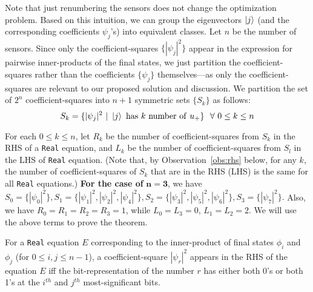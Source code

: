 Note that just renumbering the sensors does not change the optimization problem. 
Based on this intuition, we can group the eigenvectors $\ket{j}$
(and the corresponding coefficients $\psi_j$'s) into equivalent classes. 
Let $n$ be the number of sensors.  
Since only the coefficient-squares $\{|\psi_j|^2\}$ appear in the expression for pairwise inner-products of the final states, 
we just partition the coefficient-squares rather than the coefficients $\{\psi_j\}$ themselves---as only the coefficient-squares are relevant to our proposed solution and discussion. 
We partition the set of $2^n$ coefficient-squares into $n+1$ symmetric sets $\{S_k\}$ as follows: 
$$S_k =   \{|\psi_j|^{2}\ |\ \ket{j}\ {\rm has}\ k\  {\rm number\ of}\ u_{+}\}\ \ \forall \ 0 \leq k \leq n$$

\noindent
For each $0 \leq k \leq n$, let $R_k$ be the number of coefficient-squares from $S_k$ in the RHS of a {\tt Real} equation, and $L_k$ be the number of coefficient-squares from $S_l$ in the LHS of  {\tt Real} equation. (Note that, by Observation~\ref{obs:rhs} below, for any $k$, the number of coefficient-squares of $S_k$ that are in the RHS (LHS) is the same for all {\tt Real} equations.)
{\bf For the case of} $\mathbf{n=3}$, we have
$S_0 = \{|\psi_0|^{2}\}, 
S_1 = \{|\psi_1|^{2},  |\psi_2|^{2},  |\psi_4|^{2} \}, 
S_2 = \{|\psi_3|^{2},  |\psi_5|^{2},  |\psi_6|^{2} \}, 
S_3 = \{|\psi_7|^{2} \}.$ Also, we have $R_0 = R_1 = R_2 = R_3 = 1$, while $L_0 = L_3 = 0$, $L_1 = L_2 = 2$. 
We will use the above terms to prove the theorem. 
\medskip
\medskip

\begin{observation}
For a {\tt Real} equation $E$ corresponding to the inner-product of final states $\phi_i$ and $\phi_j$ (for $0 \leq i, j \leq n-1$), a coefficient-square $|\psi_r|^2$ appears in the RHS of the equation $E$ iff the bit-representation of the number $r$ has either both 0's or both 1's at the $i^{th}$ and $j^{th}$ most-significant bits.
\label{obs:rhs}
\end{observation}

